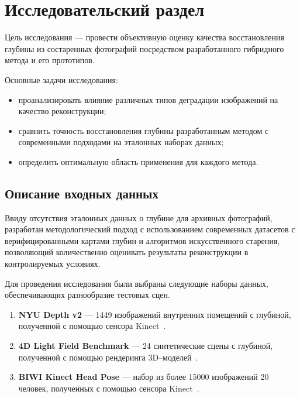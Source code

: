 \chapter{Исследовательский раздел}



Цель исследования --- провести объективную оценку качества восстановления глубины из состаренных фотографий посредством разработанного гибридного метода и его прототипов.

Основные задачи исследования:
\begin{itemize}
    \item проанализировать влияние различных типов деградации изображений на качество реконструкции;
    \item сравнить точность восстановления глубины разработанным методом с современными подходами на эталонных наборах данных;
    \item определить оптимальную область применения для каждого метода.
\end{itemize}

\section{Описание входных данных}

Ввиду отсутствия эталонных данных о глубине для архивных фотографий,
разработан методологический подход с использованием современных датасетов с верифицированными картами глубин и алгоритмов искусственного старения,
позволяющий количественно оценивать результаты реконструкции в контролируемых условиях.

Для проведения исследования были выбраны следующие наборы данных, обеспечивающих разнообразие тестовых сцен.

\begin{enumerate}
    \item \textbf{NYU Depth v2} --- 1449 изображений внутренних помещений с глубиной, полученной с помощью сенсора Kinect~\cite{silberman2012indoor}.
    \item \textbf{4D Light Field Benchmark} --- 24 синтетические сцены с глубиной, полученной с помощью рендеринга 3D--моделей~\cite{honauer2017dataset}.
    \item \textbf{BIWI Kinect Head Pose} --- набор из более 15000 изображений 20 человек, полученных с помощью сенсора Kinect~\cite{fanelli_IJCV}.
\end{enumerate}


